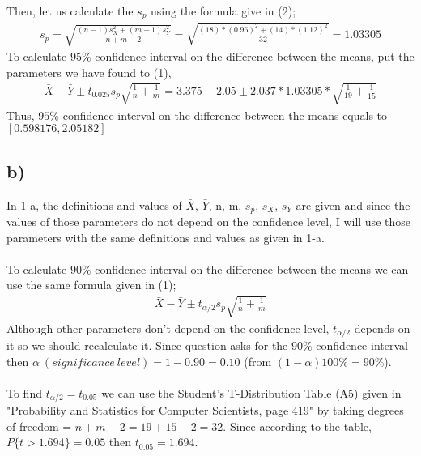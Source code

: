 \documentclass[12pt]{article}
\begin{document}
Then, let us calculate the $s_{p}$ using the formula give in (2);
\begin{equation} 
\begin{split}
s_{p} = \sqrt{\frac{(n-1)s^2_{X} + (m-1)s^2_{Y}}{n+m-2}} = \sqrt{\frac{(18)*(0.96)^{2} + (14)*(1.12)^{2}}{32}} = 1.03305
\end{split}
\end{equation}
To calculate $95\%$ confidence interval on the difference between the means, put the parameters we have found to (1),
\begin{equation} 
\begin{split}
\bar{X} - \bar{Y} \pm t_{0.025}s_{p}\sqrt{\frac{1}{n}+\frac{1}{m}} = 3.375-2.05 \pm 2.037*1.03305*\sqrt{\frac{1}{19}+\frac{1}{15}}
\end{split}
\end{equation}
Thus, $95\%$ confidence interval on the difference between the means equals to $[0.598176,2.05182]$

\subsection*{b)} In 1-a, the definitions and values of $\bar{X}$, $\bar{Y}$, n, m, $s_{p}$, $s_{X}$, $s_{Y}$ are given and since the values of those parameters do not depend on the confidence level, I will use those parameters with the same definitions and values as given in 1-a. \\ \\ 
To calculate $90\%$ confidence interval on the difference between the means we can use the same formula given in (1);
\begin{equation} 
\begin{split}
\bar{X} - \bar{Y} \pm t_{\alpha/2}s_{p}\sqrt{\frac{1}{n}+\frac{1}{m}}
\end{split}
\end{equation}
Although other parameters don't depend on the confidence level, $t_{\alpha/2}$ depends on it so we should recalculate it.
Since question asks for the $90\%$ confidence interval then $\alpha \ (significance \ level) = 1-0.90 = 0.10$ (from $(1-\alpha)100\% = 90\%$). \\ \\
To find $t_{\alpha/2} = t_{0.05}$ we can use the Student's T-Distribution Table (A5) given in "Probability and Statistics for Computer Scientists, page 419" by taking degrees of freedom = $n+m-2 = 19 + 15 -2 = 32$. Since according to the table, $P\{t > 1.694\} = 0.05$ then $t_{0.05} = 1.694$. \\
\end{document}
